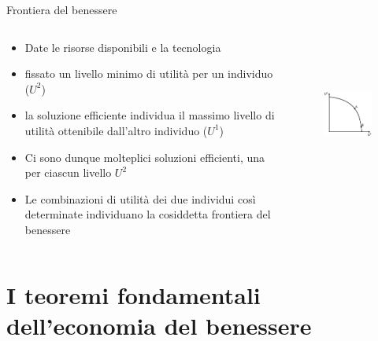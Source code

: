 \documentclass[aspectratio=149,11pt]{beamer}
\begin{document}
\begin{frame}{Frontiera del benessere}
\begin{columns}
\begin{column}{.5\columnwidth}
\begin{itemize}
\item Date le risorse disponibili e la tecnologia
\item fissato un livello minimo di utilità per un individuo ($U^2$)
\item la soluzione efficiente individua il massimo livello di utilità ottenibile dall’altro individuo ($U^1$)
\item Ci sono dunque molteplici soluzioni efficienti, una per ciascun livello $U^2$
\item Le combinazioni di utilità dei due individui così determinate individuano la cosiddetta \alert{frontiera del benessere}
\end{itemize}
\end{column}
\begin{column}{.5\columnwidth}
\begin{figure}[htbp]
\centering
\includegraphics[height=5cm]{./figure/frontiere-2.pdf}
\end{figure}
\end{column}
\end{columns}
\end{frame}

\section{I teoremi fondamentali dell'economia del benessere}
\end{document}
